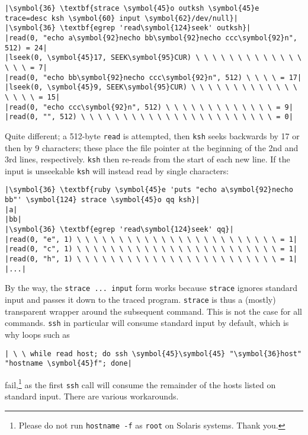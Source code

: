 \documentclass[10pt,a4paper]{article}
\begin{document}
\begin{lstlisting}
|\symbol{36} \textbf{strace \symbol{45}o outksh \symbol{45}e trace=desc ksh \symbol{60} input \symbol{62}/dev/null}|
|\symbol{36} \textbf{egrep 'read\symbol{124}seek' outksh}|
|read(0, "echo a\symbol{92}necho bb\symbol{92}necho ccc\symbol{92}n", 512) = 24|
|lseek(0, \symbol{45}17, SEEK\symbol{95}CUR) \ \ \ \ \ \ \ \ \ \ \ \ \ \ \ \ = 7|
|read(0, "echo bb\symbol{92}necho ccc\symbol{92}n", 512) \ \ \ \ = 17|
|lseek(0, \symbol{45}9, SEEK\symbol{95}CUR) \ \ \ \ \ \ \ \ \ \ \ \ \ \ \ \ \ = 15|
|read(0, "echo ccc\symbol{92}n", 512) \ \ \ \ \ \ \ \ \ \ \ \ \ = 9|
|read(0, "", 512) \ \ \ \ \ \ \ \ \ \ \ \ \ \ \ \ \ \ \ \ \ \ \ = 0|
\end{lstlisting}

Quite different; a 512-byte \texttt{read} is attempted, then
\texttt{ksh} seeks backwards by 17 or then by 9 characters; these place
the file pointer at the beginning of the 2nd and 3rd lines,
respectively. \texttt{ksh} then re-reads from the start of each new
line. If the input is unseekable \texttt{ksh} will instead read by
single characters:

\begin{lstlisting}
|\symbol{36} \textbf{ruby \symbol{45}e 'puts "echo a\symbol{92}necho bb"' \symbol{124} strace \symbol{45}o qq ksh}|
|a|
|bb|
|\symbol{36} \textbf{egrep 'read\symbol{124}seek' qq}|
|read(0, "e", 1) \ \ \ \ \ \ \ \ \ \ \ \ \ \ \ \ \ \ \ \ \ \ \ \ = 1|
|read(0, "c", 1) \ \ \ \ \ \ \ \ \ \ \ \ \ \ \ \ \ \ \ \ \ \ \ \ = 1|
|read(0, "h", 1) \ \ \ \ \ \ \ \ \ \ \ \ \ \ \ \ \ \ \ \ \ \ \ \ = 1|
|...|
\end{lstlisting}

By the way, the \texttt{strace ...  input} form works because
\texttt{strace} ignores standard input and passes it down to the traced
program. \texttt{strace} is thus a (mostly) transparent wrapper around
the subsequent command. This is not the case for all commands.
\texttt{ssh} in particular will consume standard input by default, which
is why loops such as

\begin{lstlisting}
| \ \ while read host; do ssh \symbol{45}\symbol{45} "\symbol{36}host" "hostname \symbol{45}f"; done|
\end{lstlisting}

fail,\footnote{Please do not run \texttt{hostname -f} as \texttt{root}
on Solaris systems. Thank you.} as the first \texttt{ssh} call will
consume the remainder of the hosts listed on standard input. There are
various workarounds.
\end{document}
